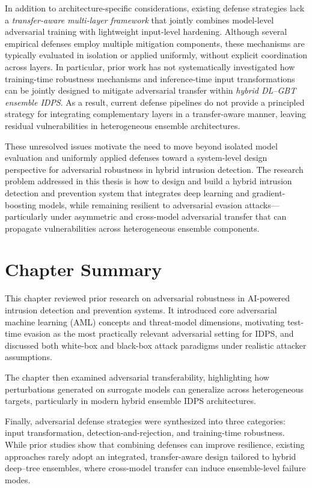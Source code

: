 \documentclass[12pt, a4paper, reqno, oneside]{book}
\begin{document}
In addition to architecture-specific considerations, existing defense strategies lack a \textit{transfer-aware multi-layer framework} that jointly combines model-level adversarial training with lightweight input-level hardening. Although several empirical defenses employ multiple mitigation components, these mechanisms are typically evaluated in isolation or applied uniformly, without explicit coordination across layers. In particular, prior work has not systematically investigated how training-time robustness mechanisms and inference-time input transformations can be jointly designed to mitigate adversarial transfer within \textit{hybrid DL--GBT ensemble IDPS}. As a result, current defense pipelines do not provide a principled strategy for integrating complementary layers in a transfer-aware manner, leaving residual vulnerabilities in heterogeneous ensemble architectures.

These unresolved issues motivate the need to move beyond isolated model evaluation and uniformly applied defenses toward a system-level design perspective for adversarial robustness in hybrid intrusion detection. The research problem addressed in this thesis is how to design and build a hybrid intrusion detection and prevention system that integrates deep learning and gradient-boosting models, while remaining resilient to adversarial evasion attacks---particularly under asymmetric and cross-model adversarial transfer that can propagate vulnerabilities across heterogeneous ensemble components.




\section{Chapter Summary}
This chapter reviewed prior research on adversarial robustness in AI-powered intrusion detection and prevention systems. It introduced core adversarial machine learning (AML) concepts and threat-model dimensions, motivating test-time evasion as the most practically relevant adversarial setting for IDPS, and discussed both white-box and black-box attack paradigms under realistic attacker assumptions.

The chapter then examined adversarial transferability, highlighting how perturbations generated on surrogate models can generalize across heterogeneous targets, particularly in modern hybrid ensemble IDPS architectures.

Finally, adversarial defense strategies were synthesized into three categories: input transformation, detection-and-rejection, and training-time robustness. While prior studies show that combining defenses can improve resilience, existing approaches rarely adopt an integrated, transfer-aware design tailored to hybrid deep--tree ensembles, where cross-model transfer can induce ensemble-level failure modes.
\end{document}
